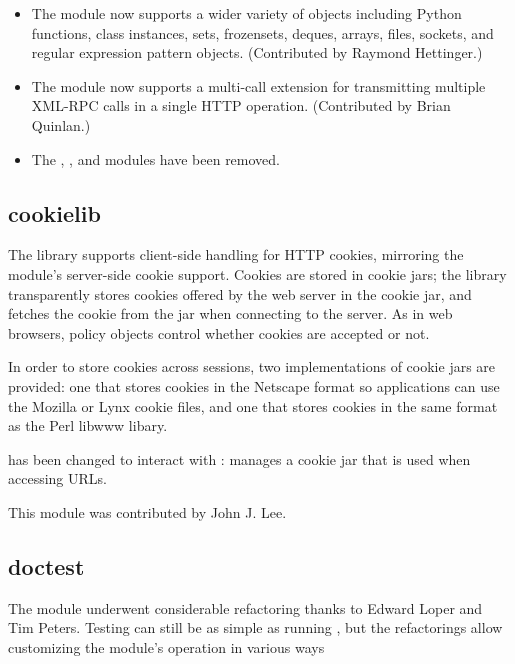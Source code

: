 \documentclass{howto}
\begin{document}
\begin{itemize}
\item The  module now supports a wider variety of objects
   including Python functions, class instances, sets, frozensets, deques,
   arrays, files, sockets, and regular expression pattern objects.
   (Contributed by Raymond Hettinger.)

\item The  module now supports a multi-call extension for 
transmitting multiple XML-RPC calls in a single HTTP operation.
(Contributed by Brian Quinlan.)

\item The , , and  modules have 
been removed.
   
\end{itemize}



\subsection{cookielib}

The  library supports client-side handling for HTTP
cookies, mirroring the  module's server-side cookie
support. Cookies are stored in cookie jars; the library transparently
stores cookies offered by the web server in the cookie jar, and
fetches the cookie from the jar when connecting to the server. As in
web browsers, policy objects control whether cookies are accepted or
not.

In order to store cookies across sessions, two implementations of
cookie jars are provided: one that stores cookies in the Netscape
format so applications can use the Mozilla or Lynx cookie files, and
one that stores cookies in the same format as the Perl libwww libary.

 has been changed to interact with :
 manages a cookie jar that is used when
accessing URLs.

This module was contributed by John J. Lee.


\subsection{doctest}

The  module underwent considerable refactoring thanks
to Edward Loper and Tim Peters.  Testing can still be as simple as
running , but the refactorings allow
customizing the module's operation in various ways
\end{document}
